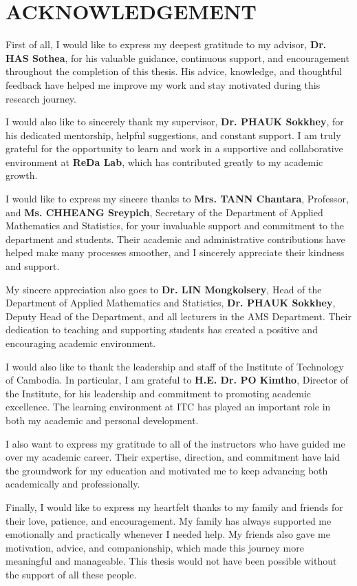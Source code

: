 \clearpage
{}
\chapter*{ACKNOWLEDGEMENT}

\hs First of all, I would like to express my deepest gratitude to my advisor, \textbf{Dr. HAS Sothea}, for his valuable guidance, continuous support, and encouragement throughout the completion of this thesis. His advice, knowledge, and thoughtful feedback have helped me improve my work and stay motivated during this research journey.

I would also like to sincerely thank my supervisor, \textbf{Dr. PHAUK Sokkhey}, for his dedicated mentorship, helpful suggestions, and constant support. I am truly grateful for the opportunity to learn and work in a supportive and collaborative environment at \textbf{ReDa Lab}, which has contributed greatly to my academic growth.

I would like  to express my sincere thanks to \textbf{Mrs. TANN Chantara}, Professor, and \textbf{Ms. CHHEANG Sreypich}, Secretary of the Department of Applied Mathematics and Statistics, for your invaluable support and commitment to the department and students. Their academic and administrative contributions have helped make many processes smoother, and I sincerely appreciate their kindness and support.

My sincere appreciation also goes to \textbf{Dr. LIN Mongkolsery}, Head of the Department of Applied Mathematics and Statistics, \textbf{Dr. PHAUK Sokkhey}, Deputy Head of the Department, and all lecturers in the AMS Department. Their dedication to teaching and supporting students has created a positive and encouraging academic environment.

I would also like to thank the leadership and staff of the Institute of Technology of Cambodia. In particular, I am grateful to \textbf{H.E. Dr. PO Kimtho}, Director of the Institute, for his leadership and commitment to promoting academic excellence. The learning environment at ITC has played an important role in both my academic and personal development.

I also want to express my gratitude to all of the instructors who have guided me over my academic career. Their expertise, direction, and commitment have laid the groundwork for my education and motivated me to keep advancing both academically and professionally.

Finally, I would like to express my heartfelt thanks to my family and friends for their love, patience, and encouragement. My family has always supported me emotionally and practically whenever I needed help. My friends also gave me motivation, advice, and companionship, which made this journey more meaningful and manageable. This thesis would not have been possible without the support of all these people.

